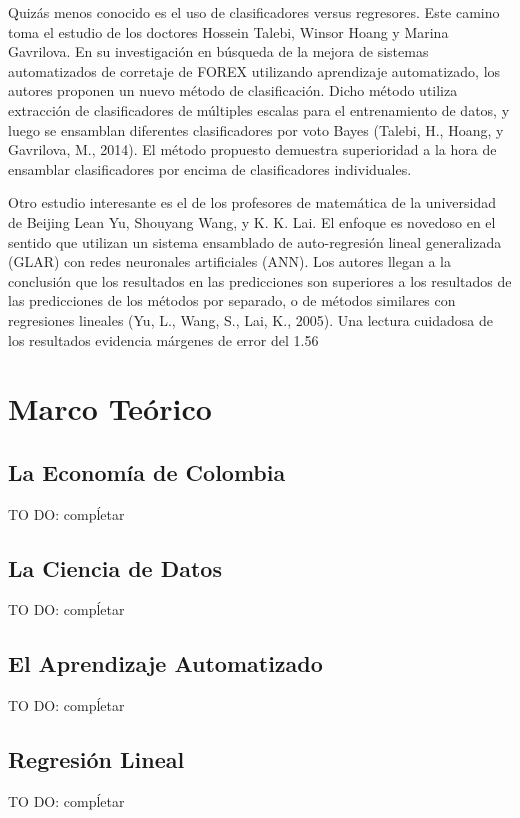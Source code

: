 Quizás menos conocido es el uso de clasificadores versus regresores. Este camino toma el estudio de los doctores Hossein Talebi, Winsor Hoang y Marina Gavrilova. En su investigación en búsqueda de la mejora de sistemas automatizados de corretaje de FOREX utilizando aprendizaje automatizado, los autores proponen un nuevo método de clasificación. Dicho método utiliza extracción de clasificadores de múltiples escalas para el entrenamiento de datos, y luego se ensamblan diferentes clasificadores por voto Bayes (Talebi, H., Hoang, y Gavrilova, M., 2014). El método propuesto demuestra superioridad a la hora de ensamblar clasificadores por encima de clasificadores individuales.
 
Otro estudio interesante es el de los profesores de matemática de la universidad de Beijing Lean Yu, Shouyang Wang, y K. K. Lai. El enfoque es novedoso en el sentido que utilizan un sistema ensamblado de auto-regresión lineal generalizada (GLAR) con redes neuronales artificiales (ANN). Los autores llegan a la conclusión que los resultados en las predicciones son superiores a los resultados de las predicciones de los métodos por separado, o de métodos similares con regresiones lineales (Yu, L., Wang, S., Lai, K., 2005). Una lectura cuidadosa de los resultados evidencia márgenes de error del 1.56%

\section{Marco Teórico}

\subsection{La Economía de Colombia}
TO DO: compĺetar

\subsection{La Ciencia de Datos}
TO DO: compĺetar

\subsection{El Aprendizaje Automatizado}
TO DO: compĺetar

\subsection{Regresión Lineal}
TO DO: compĺetar

